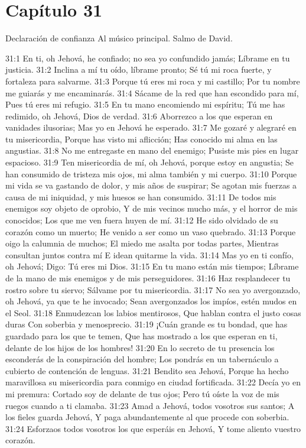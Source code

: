\section*{Capítulo 31}
Declaración de confianza 
Al músico principal. Salmo de David. 
 
31:1 En ti, oh Jehová, he confiado; no sea yo confundido jamás; 
Líbrame en tu justicia. 
31:2 Inclina a mí tu oído, líbrame pronto; 
Sé tú mi roca fuerte, y fortaleza para salvarme. 
31:3 Porque tú eres mi roca y mi castillo; 
Por tu nombre me guiarás y me encaminarás. 
31:4 Sácame de la red que han escondido para mí, 
Pues tú eres mi refugio. 
31:5 En tu mano encomiendo mi espíritu;  
Tú me has redimido, oh Jehová, Dios de verdad. 
31:6 Aborrezco a los que esperan en vanidades ilusorias; 
Mas yo en Jehová he esperado. 
31:7 Me gozaré y alegraré en tu misericordia, 
Porque has visto mi aflicción; 
Has conocido mi alma en las angustias. 
31:8 No me entregaste en mano del enemigo; 
Pusiste mis pies en lugar espacioso. 
31:9 Ten misericordia de mí, oh Jehová, porque estoy en angustia; 
Se han consumido de tristeza mis ojos, mi alma también y mi cuerpo. 
31:10 Porque mi vida se va gastando de dolor, y mis años de suspirar; 
Se agotan mis fuerzas a causa de mi iniquidad, y mis huesos se han consumido. 
31:11 De todos mis enemigos soy objeto de oprobio, 
Y de mis vecinos mucho más, y el horror de mis conocidos; 
Los que me ven fuera huyen de mí. 
31:12 He sido olvidado de su corazón como un muerto; 
He venido a ser como un vaso quebrado. 
31:13 Porque oigo la calumnia de muchos; 
El miedo me asalta por todas partes, 
Mientras consultan juntos contra mí 
E idean quitarme la vida. 
31:14 Mas yo en ti confío, oh Jehová; 
Digo: Tú eres mi Dios. 
31:15 En tu mano están mis tiempos; 
Líbrame de la mano de mis enemigos y de mis perseguidores. 
31:16 Haz resplandecer tu rostro sobre tu siervo; 
Sálvame por tu misericordia. 
31:17 No sea yo avergonzado, oh Jehová, ya que te he invocado; 
Sean avergonzados los impíos, estén mudos en el Seol. 
31:18 Enmudezcan los labios mentirosos, 
Que hablan contra el justo cosas duras 
Con soberbia y menosprecio. 
31:19 ¡Cuán grande es tu bondad, que has guardado para los que te temen, 
Que has mostrado a los que esperan en ti, delante de los hijos de los hombres! 
31:20 En lo secreto de tu presencia los esconderás de la conspiración del hombre; 
Los pondrás en un tabernáculo a cubierto de contención de lenguas. 
31:21 Bendito sea Jehová, 
Porque ha hecho maravillosa su misericordia para conmigo en ciudad fortificada. 
31:22 Decía yo en mi premura: Cortado soy de delante de tus ojos; 
Pero tú oíste la voz de mis ruegos cuando a ti clamaba. 
31:23 Amad a Jehová, todos vosotros sus santos; 
A los fieles guarda Jehová, 
Y paga abundantemente al que procede con soberbia. 
31:24 Esforzaos todos vosotros los que esperáis en Jehová, 
Y tome aliento vuestro corazón. 
